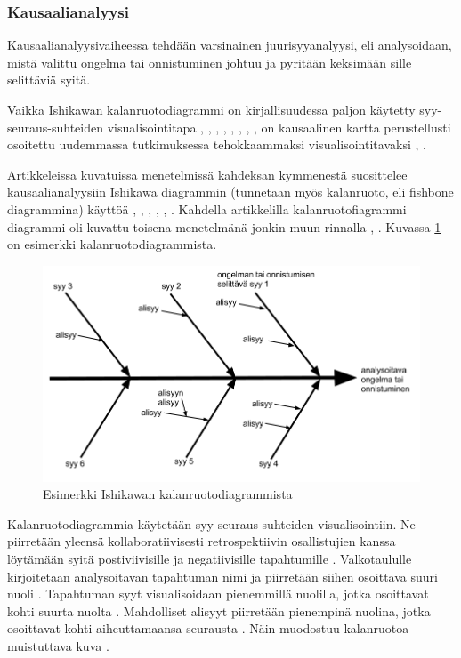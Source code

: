 \subsubsection{Kausaalianalyysi}
Kausaalianalyysivaiheessa tehdään varsinainen juurisyyanalyysi, eli analysoidaan, mistä valittu ongelma tai onnistuminen johtuu ja pyritään keksimään sille selittäviä syitä. 

Vaikka Ishikawan kalanruotodiagrammi \citep{ishikawa1990introduction} on kirjallisuudessa paljon käytetty syy-seuraus-suhteiden visualisointitapa \citep{kalinowski2012evidence}, \citep{Bjornson2009}, \citep{de2004learning}, \citep{staalhane2004root}, \citep{dingsoyr2003extending}, \citep{staalhane2003post}, \citep{birk2002postmortem}, \citep{card1998learning}, on kausaalinen kartta perustellusti osoitettu uudemmassa tutkimuksessa tehokkaammaksi visualisointitavaksi \citep{Bjornson2009}, \citep{Lehtinen2011}. 

Artikkeleissa kuvatuissa menetelmissä kahdeksan kymmenestä suosittelee kausaalianalyysiin Ishikawa diagrammin (tunnetaan myös kalanruoto, eli fishbone diagrammina) käyttöä \citep{kalinowski2012evidence}, \citep{de2004learning}, \citep{staalhane2004root}, \citep{dingsoyr2003extending}, \citep{birk2002postmortem}, \citep{card1998learning}. Kahdella artikkelilla kalanruotofiagrammi diagrammi oli kuvattu toisena menetelmänä jonkin muun rinnalla \citep{Bjornson2009}, \citep{staalhane2003post}. Kuvassa \ref{ishikawa_ex} on esimerkki kalanruotodiagrammista.

\begin{figure}[ht!]
\centering
\includegraphics[width=150mm]{ishikawa_esimerkki.png}
\caption{Esimerkki Ishikawan kalanruotodiagrammista}
\label{ishikawa_ex}
\end{figure}

Kalanruotodiagrammia käytetään syy-seuraus-suhteiden visualisointiin. Ne piirretään yleensä kollaboratiivisesti retrospektiivin osallistujien kanssa löytämään syitä postiviivisille ja negatiivisille tapahtumille \citep{birk2002postmortem}. Valkotaululle kirjoitetaan analysoitavan tapahtuman nimi ja piirretään siihen osoittava suuri nuoli \citep{Bjornson2009}. Tapahtuman syyt visualisoidaan pienemmillä nuolilla, jotka osoittavat kohti suurta nuolta \citep{Bjornson2009}. Mahdolliset alisyyt piirretään pienempinä nuolina, jotka osoittavat kohti aiheuttamaansa seurausta \citep{Bjornson2009}. Näin muodostuu kalanruotoa muistuttava kuva \citep{birk2002postmortem}.


